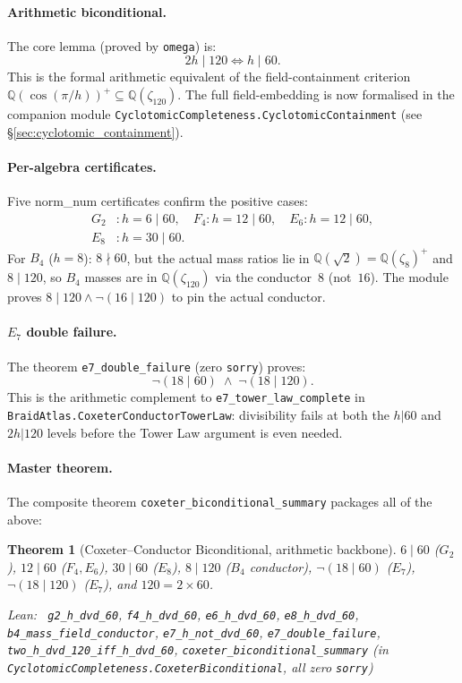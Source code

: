 \documentclass[11pt,a4paper]{article}
\newenvironment{leanref}%
  {\par\smallskip\noindent\begingroup\raggedright\textup{Lean:}~}%
  {\par\endgroup}
\newtheorem{theorem}{Theorem}[section]
\theoremstyle{definition}
\begin{document}
\paragraph{Arithmetic biconditional.}
The core lemma (proved by \texttt{omega}) is:
\[
  2h \mid 120 \iff h \mid 60.
\]
This is the formal arithmetic equivalent of the field-containment criterion
$\mathbb{Q}(\cos(\pi/h))^+ \subseteq \mathbb{Q}(\zeta_{120})$.  The full
field-embedding is now formalised in the companion module
\texttt{CyclotomicCompleteness.CyclotomicContainment}
(see \S\ref{sec:cyclotomic_containment}).

\paragraph{Per-algebra certificates.}
Five norm\_num certificates confirm the positive cases:
\begin{align*}
  G_2 &: h = 6 \mid 60, \quad
  F_4 : h = 12 \mid 60, \quad
  E_6 : h = 12 \mid 60, \\
  E_8 &: h = 30 \mid 60.
\end{align*}
For $B_4$ ($h=8$): $8 \nmid 60$, but the actual mass ratios lie in
$\mathbb{Q}(\sqrt{2}) = \mathbb{Q}(\zeta_8)^+$ and $8 \mid 120$, so $B_4$
masses are in $\mathbb{Q}(\zeta_{120})$ via the conductor~$8$ (not~$16$).
The module proves $8 \mid 120 \land \lnot(16 \mid 120)$ to pin the actual
conductor.

\paragraph{$E_7$ double failure.}
The theorem \lstinline|e7_double_failure| (zero \texttt{sorry}) proves:
\[
  \lnot(18 \mid 60) \;\land\; \lnot(18 \mid 120).
\]
This is the arithmetic complement to \lstinline|e7_tower_law_complete| in
\texttt{BraidAtlas.CoxeterConductorTowerLaw}: divisibility fails at both the
$h|60$ and $2h|120$ levels before the Tower Law argument is even needed.

\paragraph{Master theorem.}
The composite theorem \lstinline|coxeter_biconditional_summary| packages all
of the above:
\begin{theorem}[Coxeter--Conductor Biconditional, arithmetic backbone]
\label{thm:coxeter_biconditional_summary}
$6 \mid 60$ ($G_2$), $12 \mid 60$ ($F_4, E_6$), $30 \mid 60$ ($E_8$),
$8 \mid 120$ ($B_4$ conductor), $\lnot(18 \mid 60)$ ($E_7$),
$\lnot(18 \mid 120)$ ($E_7$), and $120 = 2 \times 60$.
\begin{leanref}
\lstinline|g2_h_dvd_60|, \lstinline|f4_h_dvd_60|, \lstinline|e6_h_dvd_60|,
\lstinline|e8_h_dvd_60|, \lstinline|b4_mass_field_conductor|,
\lstinline|e7_h_not_dvd_60|, \lstinline|e7_double_failure|,
\lstinline|two_h_dvd_120_iff_h_dvd_60|,
\lstinline|coxeter_biconditional_summary|
\textup{(in \texttt{CyclotomicCompleteness.CoxeterBiconditional}, all zero \texttt{sorry})}
\end{leanref}
\end{theorem}
\end{document}
